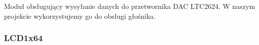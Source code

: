 \documentclass{article}
\begin{document}
\begin{figure}[H]
    \centering
\end{figure}

Moduł obsługujący wysyłanie danych do przetwornika DAC LTC2624. W naszym projekcie wykorzystujemy go do obsługi głośnika.

\subsubsection{LCD1x64}

\begin{figure}[H]
    \centering
\end{figure}
\end{document}
